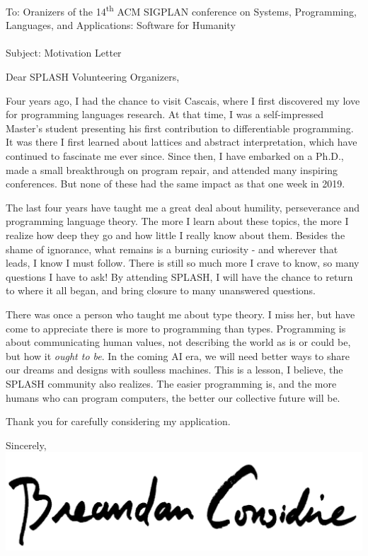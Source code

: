 \documentclass{letter}
\begin{document}
    \begin{letter}{To: Oranizers of the 14\textsuperscript{th} ACM SIGPLAN conference on Systems, Programming, Languages, and Applications: Software for Humanity\\\phantom{.}\\Subject: Motivation Letter\\}
        \opening{Dear SPLASH Volunteering Organizers,}
        Four years ago, I had the chance to visit Cascais, where I first discovered my love for programming languages research. At that time, I was a self-impressed Master’s student presenting his first contribution to differentiable programming. It was there I first learned about lattices and abstract interpretation, which have continued to fascinate me ever since. Since then, I have embarked on a Ph.D., made a small breakthrough on program repair, and attended many inspiring conferences. But none of these had the same impact as that one week in 2019.

        The last four years have taught me a great deal about humility, perseverance and programming language theory. The more I learn about these topics, the more I realize how deep they go and how little I really know about them. Besides the shame of ignorance, what remains is a burning curiosity - and wherever that leads, I know I must follow. There is still so much more I crave to know, so many questions I have to ask! By attending SPLASH, I will have the chance to return to where it all began, and bring closure to many unanswered questions.

        There was once a person who taught me about type theory. I miss her, but have come to appreciate there is more to programming than types. Programming is about communicating human values, not describing the world as is or could be, but how it \textit{ought to be}. In the coming AI era, we will need better ways to share our dreams and designs with soulless machines. This is a lesson, I believe, the SPLASH community also realizes. The easier programming is, and the more humans who can program computers, the better our collective future will be.

        Thank you for carefully considering my application.

        \closing{Sincerely,\\
        \includegraphics[scale=0.06]{signature}\\
        }
    \end{letter}
\end{document}
